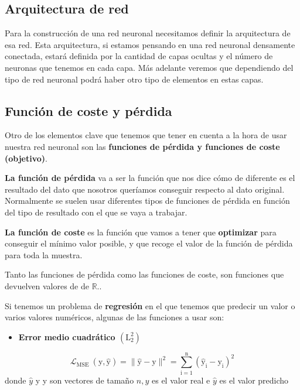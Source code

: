 \documentclass[
  a4paper,
  DIV=11,
  numbers=noendperiod]{scrreprt}
\providecommand{\tightlist}{%
  \setlength{\itemsep}{0pt}\setlength{\parskip}{0pt}}\usepackage{longtable,booktabs,array}
\begin{document}
\subsection{Arquitectura de red}\label{arquitectura-de-red}

Para la construcción de una red neuronal necesitamos definir la
arquitectura de esa red. Esta arquitectura, si estamos pensando en una
red neuronal densamente conectada, estará definida por la cantidad de
capas ocultas y el número de neuronas que tenemos en cada capa. Más
adelante veremos que dependiendo del tipo de red neuronal podrá haber
otro tipo de elementos en estas capas.

\subsection{Función de coste y
pérdida}\label{funciuxf3n-de-coste-y-puxe9rdida}

Otro de los elementos clave que tenemos que tener en cuenta a la hora de
usar nuestra red neuronal son las \textbf{funciones de pérdida y
funciones de coste (objetivo)}.

\textbf{La función de pérdida} va a ser la función que nos dice cómo de
diferente es el resultado del dato que nosotros queríamos conseguir
respecto al dato original. Normalmente se suelen usar diferentes tipos
de funciones de pérdida en función del tipo de resultado con el que se
vaya a trabajar.

\textbf{La función de coste} es la función que vamos a tener que
\textbf{optimizar} para conseguir el mínimo valor posible, y que recoge
el valor de la función de pérdida para toda la muestra.

Tanto las funciones de pérdida como las funciones de coste, son
funciones que devuelven valores de de \(\mathbb{R}\)..

Si tenemos un problema de \textbf{regresión} en el que tenemos que
predecir un valor o varios valores numéricos, algunas de las funciones a
usar son:

\begin{itemize}
\tightlist
\item
  \textbf{Error medio cuadrático \(\left(\mathrm{L}_2^2\right)\)}
\end{itemize}

\[
\mathcal{L}_{\text {MSE }}(\mathrm{y}, \hat{\mathrm{y}})=\|\hat{\mathrm{y}}-\mathrm{y}\|^2=\sum_{\mathrm{i}=1}^{\mathrm{n}}\left(\hat{\mathrm{y}}_{\mathrm{i}}-\mathrm{y}_{\mathrm{i}}\right)^2
\] donde \(\hat{y}\) y y son vectores de tamaño \(n, y\) es el valor
real e \(\hat{y}\) es el valor predicho
\end{document}

